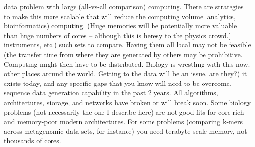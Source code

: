 \documentclass[times]{cpeauth}
\begin{document}
%
%
data problem with large (all-vs-all comparison) computing. There are strategies
to make this more scalable that will reduce the computing volume.
%
%
analytics, bioinformatics)
%
%
%
%
computing. (Huge memories will be potentially more valuable than huge numbers of
cores -- although this is heresy to the physics crowd.)
%
instruments, etc.)
%
%
such sets to compare. Having them all local may not be feasible (the transfer
time from where they are generated by others may be prohibitive. Computing might
then have to be distributed. Biology is wrestling with this now.
%
%
%
%
%
%
%
%
%
other places around the world. Getting to the data will be an issue.
%
are they?)
%
%
it exists today, and any specific gaps that you know will need to be overcome.
%
sequence data generation capability in the past 2 years. All algorithms,
architectures, storage, and networks have broken or will break soon. Some
biology problems (not necessarily the one I describe here) are not good fits for
core-rich and memory-poor modern architectures. For some problems (comparing
k-mers across metagenomic data sets, for instance) you need terabyte-scale
memory, not thousands of cores.
\end{document}
